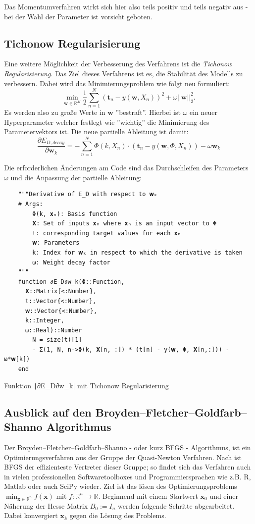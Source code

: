 \documentclass{article}
\theoremstyle{plain} %
\theoremstyle{definition} %
\begin{document}
Das Momentumverfahren wirkt sich hier also teils positiv und teils negativ aus - bei der Wahl der Parameter ist vorsicht geboten.

\subsection{Tichonow Regularisierung}
Eine weitere Möglichkeit der Verbesserung des Verfahrens ist die \emph{Tichonow Regularisierung}. Das Ziel dieses Verfahrens ist es, die Stabilität des Modells zu verbessern. Dabei wird das Minimierungsproblem wie folgt neu formuliert:
$$
  \min_{\mathbf{w} \in \mathbb{R}^M} \frac{1}{2}\sum_{n=1}^{N}(\mathbf{t}_n - y(\mathbf{w}, X_n))^2 + \omega ||\mathbf{w}||^2_2.
$$
Es werden also zu große Werte in $\mathbf{w}$ ''bestraft''. Hierbei ist $\omega$ ein neuer Hyperparameter welcher festlegt wie ''wichtig'' die Minimierung des Parametervektors ist. Die neue partielle Ableitung ist damit:
$$
  \frac{\partial E_{D, decay}}{\partial \mathbf{w}_k} = - \sum_{n=1}^N \Phi(k, X_n) \cdot (\mathbf{t}_n - y(\mathbf{w}, \Phi, X_n)) - \omega \mathbf{w}_k
$$

Die erforderlichen Änderungen am Code sind das Durchschleifen des Parameters $\omega$ und die Anpassung der partielle Ableitung:

\begin{listing}[H]
  \begin{verbatim}
    """Derivative of E_D with respect to 𝐰ₖ
    # Args:
        Φ(k, 𝐱ₙ): Basis function
        𝐗: Set of inputs 𝐱ₙ where 𝐱ₙ is an input vector to Φ
        t: corresponding target values for each 𝐱ₙ
        𝐰: Parameters
        k: Index for 𝐰ₖ in respect to which the derivative is taken
        ω: Weight decay factor
    """
    function ∂E_D∂w_k(Φ::Function,
      𝐗::Matrix{<:Number},
      t::Vector{<:Number},
      𝐰::Vector{<:Number},
      k::Integer,
      ω::Real)::Number
        N = size(t)[1]
        - Σ(1, N, n->Φ(k, 𝐗[n, :]) * (t[n] - y(𝐰, Φ, 𝐗[n,:])) - ω*𝐰[k])
    end
  \end{verbatim}
  \caption{Funktion \texttt|∂E_D∂w_k| mit Tichonow Regularisierung}
  \label{listing:decay}
\end{listing}

\subsection{Ausblick auf den Broyden–Fletcher–Goldfarb–Shanno Algorithmus}

Der Broyden–Fletcher–Goldfarb–Shanno - oder kurz BFGS - Algorithmus, ist ein Optimierungsverfahren aus der Gruppe der Quasi-Newton Verfahren. Nach \cite{Dai} ist BFGS der effizienteste Vertreter dieser Gruppe; so findet sich das Verfahren auch in vielen professionellen Softwaretoolboxes und Programmiersprachen wie z.B. R, Matlab oder auch SciPy wieder.
Ziel ist das lösen des Optimierungsproblems $\min_{\mathbf{x} \in \mathbb{R}^n} f(\mathbf{x})$ mit $f: \mathbb{R}^n \rightarrow \mathbb{R}$.
Beginnend mit einem Startwert $\mathbf{x}_0$ und einer Näherung der Hesse Matrix $B_0 := I_n$ werden folgende Schritte abgearbeitet. Dabei konvergiert $\mathbf{x}_k$ gegen die Lösung des Problems.
\end{document}
